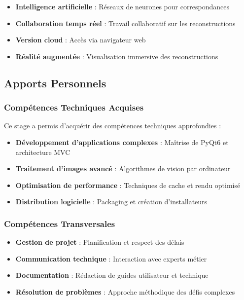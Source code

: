 \documentclass[12pt,a4paper]{article}
\begin{document}
\begin{itemize}
\item \textbf{Intelligence artificielle} : Réseaux de neurones pour correspondances
\item \textbf{Collaboration temps réel} : Travail collaboratif sur les reconstructions
\item \textbf{Version cloud} : Accès via navigateur web
\item \textbf{Réalité augmentée} : Visualisation immersive des reconstructions
\end{itemize}

\subsection{Apports Personnels}

\subsubsection{Compétences Techniques Acquises}

Ce stage a permis d'acquérir des compétences techniques approfondies :

\begin{itemize}
\item \textbf{Développement d'applications complexes} : Maîtrise de PyQt6 et architecture MVC
\item \textbf{Traitement d'images avancé} : Algorithmes de vision par ordinateur
\item \textbf{Optimisation de performance} : Techniques de cache et rendu optimisé
\item \textbf{Distribution logicielle} : Packaging et création d'installateurs
\end{itemize}

\subsubsection{Compétences Transversales}

\begin{itemize}
\item \textbf{Gestion de projet} : Planification et respect des délais
\item \textbf{Communication technique} : Interaction avec experts métier
\item \textbf{Documentation} : Rédaction de guides utilisateur et technique
\item \textbf{Résolution de problèmes} : Approche méthodique des défis complexes
\end{itemize}
\end{document}
